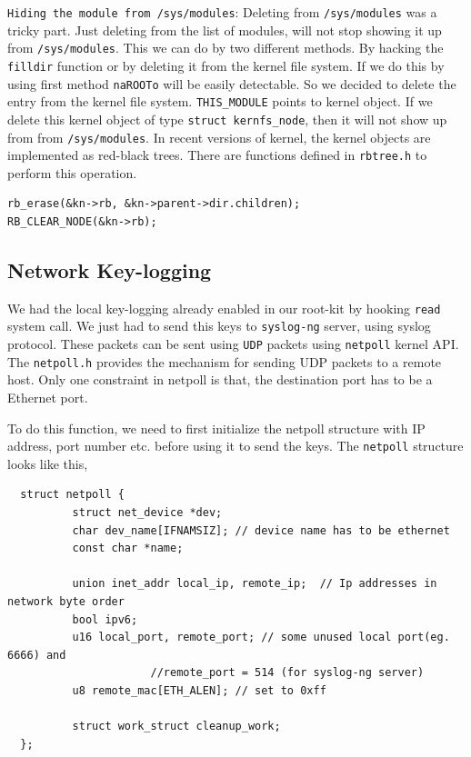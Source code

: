 \documentclass[10pt, letterpaper]{scrartcl}
\begin{document}
\texttt{Hiding the module from /sys/modules}: Deleting from \texttt{/sys/modules} was a tricky part. 
Just deleting from the list of modules, will not stop showing it up from \texttt{/sys/modules}.
This we can do by two different methods. By hacking the \texttt{filldir} function or by deleting it from the 
kernel file system. If we do this by using first method \texttt{naROOTo} will be easily detectable. 
So we decided to delete the entry from the kernel file system. \texttt{THIS\_MODULE} points to kernel object. 
If we delete this kernel object of type \texttt{struct kernfs\_node}, then it will not show up from from \texttt{/sys/modules}. 
In recent versions of kernel, the kernel objects are implemented as red-black trees. 
There are functions defined in \texttt{rbtree.h} to perform this operation. 

\begin{verbatim}
rb_erase(&kn->rb, &kn->parent->dir.children);
RB_CLEAR_NODE(&kn->rb);
\end{verbatim}


\subsection{Network Key-logging}
We had the local key-logging already enabled in our root-kit by hooking \texttt{read} system call. 
We just had to send this keys to \texttt{syslog-ng} server, using syslog protocol. 
These packets can be sent using \texttt{UDP} packets using \texttt{netpoll} kernel API. 
The \texttt{netpoll.h} provides the mechanism for sending UDP packets to a remote host. 
Only one constraint in netpoll is that, the destination port has to be a Ethernet port. 

To do this function, we need to first initialize the netpoll structure with IP address, port number etc. 
before using it to send the keys. 
The \texttt{netpoll} structure looks like this, 

\begin{verbatim}
  struct netpoll {
          struct net_device *dev;
          char dev_name[IFNAMSIZ]; // device name has to be ethernet
          const char *name; 
  
          union inet_addr local_ip, remote_ip;	// Ip addresses in network byte order
          bool ipv6; 
          u16 local_port, remote_port; // some unused local port(eg. 6666) and 
				      //remote_port = 514 (for syslog-ng server)
          u8 remote_mac[ETH_ALEN]; // set to 0xff
  
          struct work_struct cleanup_work;
  };
\end{verbatim}
\end{document}
